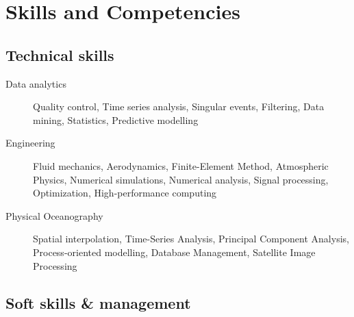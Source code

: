 \documentclass[10pt,a4paper,svgnames]{article}
\begin{document}
\newpage

\section{Skills and Competencies}

\subsection{Technical skills}

\begin{description}

\item[Data analytics] Quality control, Time series analysis, Singular events, Filtering, Data mining, Statistics, Predictive modelling

\item[Engineering] Fluid mechanics, Aerodynamics, Finite-Element Method, Atmospheric Physics, Numerical simulations, Numerical analysis, Signal processing, Optimization, High-performance computing

\item[Physical Oceanography] Spatial interpolation, Time-Series Analysis, Principal Component Analysis, Process-oriented modelling, Database Management, Satellite Image Processing

\end{description}


\subsection{Soft skills \& management}
\end{document}
